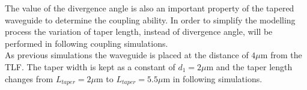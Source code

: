 The value of the divergence angle is also an important property of the tapered waveguide to determine the coupling ability. In order to simplify the modelling process the variation of taper length, instead of divergence angle, will be performed in following coupling simulations. \\

As previous simulations the waveguide is placed at the distance of $4\mu$m from the TLF. The taper width is kept  as a constant of $d_{1}=2\mu$m and the taper length changes from $L_{taper}=2\mu$m to $ L_{taper}=5.5\mu$m in following simulations.\\
  
